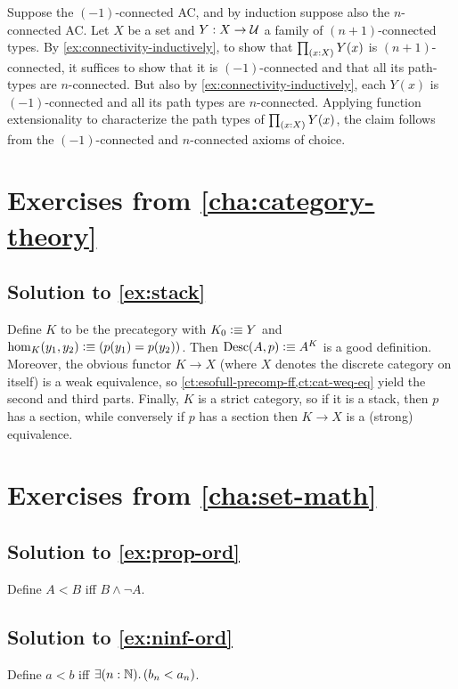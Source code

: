 \documentclass[
%
%
11pt %
]{article}
\begin{document}
Suppose the $(-1)$-connected AC, and by induction suppose also the $n$-connected AC.
Let $X$ be a set and $Y:X\to \mathcal{U}$ a family of $(n+1)$-connected types.
By \autoref{ex:connectivity-inductively}, to show that $\prd{x:X} Y(x)$ is $(n+1)$-connected, it suffices to show that it is $(-1)$-connected and that all its path-types are $n$-connected.
But also by \autoref{ex:connectivity-inductively}, each $Y(x)$ is $(-1)$-connected and all its path types are $n$-connected.
Applying function extensionality to characterize the path types of $\prd{x:X} Y(x)$, the claim follows from the $(-1)$-connected and $n$-connected axioms of choice.

\section*{Exercises from \autoref{cha:category-theory}}

\subsection*{Solution to \autoref{ex:stack}}

Define $K$ to be the precategory with $K_0 \vcentcolon\equiv Y$ and $\hom_K(y_1,y_2) \vcentcolon\equiv (p(y_1)=p(y_2))$.
Then $\mathrm{Desc}(A,p)\vcentcolon\equiv A^K$ is a good definition.
Moreover, the obvious functor $K\to X$ (where $X$ denotes the discrete category on itself) is a weak equivalence, so \autoref{ct:esofull-precomp-ff,ct:cat-weq-eq} yield the second and third parts.
Finally, $K$ is a strict category, so if it is a stack, then $p$ has a section, while conversely if $p$ has a section then $K\to X$ is a (strong) equivalence.

\section*{Exercises from \autoref{cha:set-math}}

\subsection*{Solution to \autoref{ex:prop-ord}}

Define $A<B$ iff $B \land \neg A$.

\subsection*{Solution to \autoref{ex:ninf-ord}}

Define $a<b$ iff $\exis{n:\nat} (b_n < a_n)$.
\end{document}
